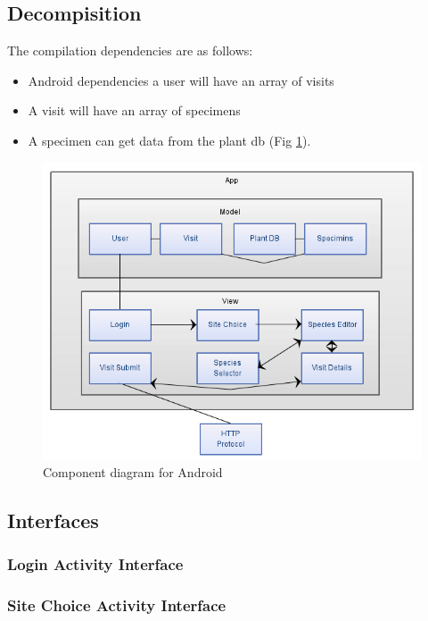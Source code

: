 \subsection{Decompisition}
	The compilation dependencies are as follows:
	\begin{itemize}
		\item Android dependencies a user will have an array of visits
		\item A visit will have an array of specimens
		\item A specimen can get data from the plant db (Fig \ref{fig:androidComponentDiagram}).
	\end{itemize}
	
	\begin{figure}
		\centering
			\includegraphics[scale=0.75]{android/componentDiagram.png}
		\caption{Component diagram for Android}
		\label{fig:androidComponentDiagram}
	\end{figure}

\newpage
\subsection{Interfaces}
	\subsubsection{Login Activity Interface}
		

	\newpage
	\subsubsection{Site Choice Activity Interface}
		

